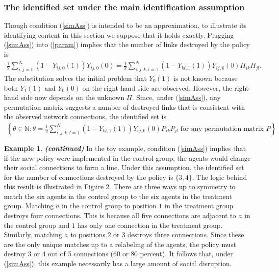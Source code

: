 \documentclass[12pt]{article}
\theoremstyle{definition}
\newtheorem{myexp}{Example}
\newenvironment{myexpcont}
{\addtocounter{myexp}{-1}\begin{myexp}{\textit{\textbf{{(continued)}}}}}
  {\end{myexp}}
\begin{document}
\subsubsection{The identified set under the main identification assumption}
Though condition (\ref{simAss}) is intended to be an approximation, to illustrate its identifying content in this section we suppose that it holds exactly. Plugging (\ref{simAss}) into (\ref{param}) implies that the number of links destroyed by the policy is   
\begin{align*}
\frac{1}{2}\sum_{i,j = 1}^{N}(1-Y_{ij,0}(1))Y_{ij,0}(0) = \frac{1}{2}\sum_{i,j,k,l = 1}^{N}(1-Y_{kl,1}(1))Y_{ij,0}(0)\Pi_{ik}\Pi_{jl}.
\end{align*}
The substitution solves the initial problem that $Y_{0}(1)$ is not known because both $Y_{1}(1)$ and $Y_{0}(0)$ on the right-hand side are observed. However, the right-hand side now depends on the unknown $\Pi$. Since, under (\ref{simAss}), any permutation matrix suggests a number of destroyed links that is consistent with the observed network connections, the identified set is   
 \begin{align}\label{paramset2}
 \left\{\theta \in \mathbb{N}: \theta = \frac{1}{2}\sum_{i,j,k,l = 1}^{N}(1-Y_{kl,1}(1))Y_{ij,0}(0)P_{ik}P_{jl} \text{ for any permutation matrix } P \right\}.
 \end{align}


\begin{myexpcont}
In the toy example, condition (\ref{simAss}) implies that if the new policy were implemented in the control group, the agents would change their social connections to form a line. Under this assumption, the identified set for the number of connections destroyed by the policy is $\{3,4\}$. The logic behind this result is illustrated in Figure 2. There are three ways up to symmetry to match the six agents in the control group to the six agents in the treatment group. Matching  $a$ in the control group to position $1$ in the treatment group destroys four connections. This is because all five connections are adjacent to $a$ in the control group and $1$ has only one connection in the treatment group. Similarly, matching $a$ to positions $2$ or $3$ destroys three connections. Since these are the only unique matches up to a relabeling of the agents, the policy must destroy 3 or 4 out of 5 connections ($60$ or $80$ percent). It follows that, under  (\ref{simAss}), this example necessarily has a large amount of social disruption.   
\end{myexpcont}
\end{document}

